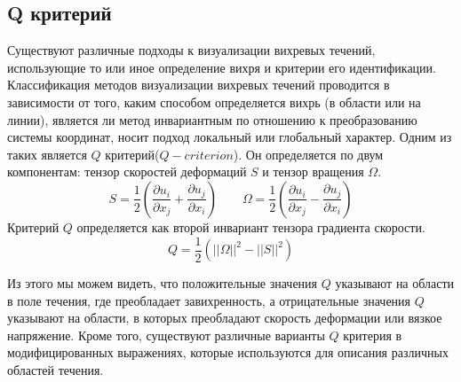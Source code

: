 \subsection{Q критерий}
	Существуют различные подходы к визуализации вихревых течений, использующие то или иное определение вихря и критерии его идентификации. Классификация методов визуализации вихревых течений проводится в зависимости от того, каким способом определяется вихрь (в области или на линии), является ли метод инвариантным по отношению к преобразованию системы координат, носит подход локальный или глобальный характер\cite{Hunt1988}. Одним из таких является $Q$ критерий($Q-criterion$). Он определяется по двум компонентам: тензор скоростей деформаций $S$ и тензор вращения $\Omega$. 
	\begin{equation}
		S = \frac{1}{2}(\frac{\partial u_i}{\partial x_j} + \frac{\partial u_j}{\partial x_i}) \qquad \Omega = \frac{1}{2}(\frac{\partial u_i}{\partial x_j} - \frac{\partial u_j}{\partial x_i})
	\end{equation}
	Критерий $Q$ определяется как второй инвариант тензора градиента скорости\cite{Wiebel2007}.
	\begin{equation}
		Q = \frac{1}{2}(||\Omega||^2 - ||S||^2)
	\end{equation}
	
	Из этого мы можем видеть, что положительные значения $Q$ указывают на области в поле течения, где преобладает завихренность, а отрицательные значения $Q$ указывают на области, в которых преобладают скорость деформации или вязкое напряжение. Кроме того, существуют различные варианты $Q$ критерия в модифицированных выражениях, которые используются для описания различных областей течения\cite{Berdahl1993,Chong1990}.
	
